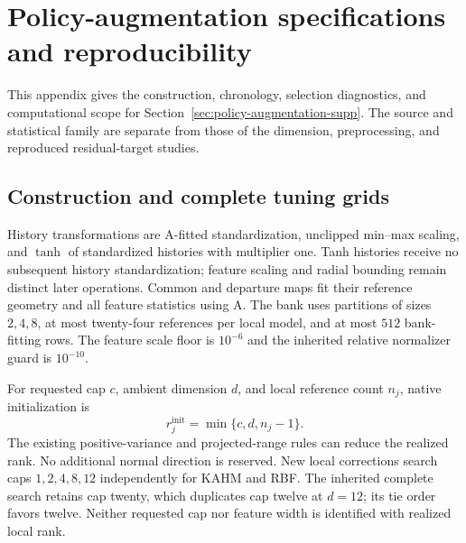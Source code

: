 \section{Policy-augmentation specifications and reproducibility}
\label{app:policy-augmentation}

This appendix gives the construction, chronology, selection diagnostics,
and computational scope for Section~\ref{sec:policy-augmentation-supp}.
The source and statistical family are separate from those of the
dimension, preprocessing, and reproduced residual-target studies.

\subsection{Construction and complete tuning grids}

History transformations are A-fitted standardization, unclipped min--max
scaling, and $\tanh$ of standardized histories with multiplier one.
Tanh histories receive no subsequent history standardization; feature
scaling and radial bounding remain distinct later operations. Common
and departure maps fit their reference geometry and all feature
statistics using A. The bank uses partitions of sizes $2,4,8$, at most
twenty-four references per local model, and at most $512$ bank-fitting
rows. The feature scale floor is $10^{-6}$ and the inherited relative
normalizer guard is $10^{-10}$.

For requested cap $c$, ambient dimension $d$, and local reference count
$n_j$, native initialization is
\begin{equation}
 r_j^{\mathrm{init}}=\min\{c,d,n_j-1\}.
 \label{eq:supp-pa-rank}
\end{equation}
The existing positive-variance and projected-range rules can reduce the
realized rank. No additional normal direction is reserved. New local
corrections search caps $1,2,4,8,12$ independently for KAHM and RBF.
The inherited complete search retains cap twenty, which duplicates cap
twelve at $d=12$; its tie order favors twelve. Neither requested cap
nor feature width is identified with realized local rank.

